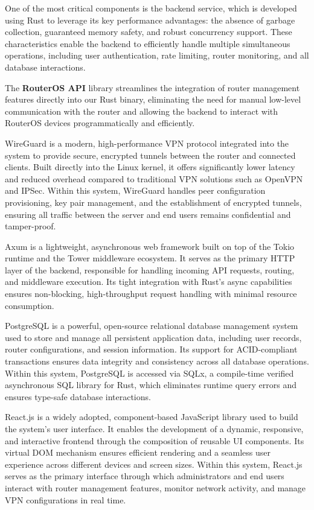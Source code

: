\documentclass[12pt,a4paper,oneside]{report}
\begin{document}
One of the most critical components is the backend service, which is developed using Rust to leverage its key performance advantages: the absence of garbage collection, guaranteed memory safety, and robust concurrency support. These characteristics enable the backend to efficiently handle multiple simultaneous operations, including user authentication, rate limiting, router monitoring, and all database interactions.


The \textbf{RouterOS API} library streamlines the integration of router management features directly into our Rust binary, eliminating the need for manual low-level communication with the router and allowing the backend to interact with RouterOS devices programmatically and efficiently.


WireGuard is a modern, high-performance VPN protocol integrated into the system to provide secure, encrypted tunnels between the router and connected clients. Built directly into the Linux kernel, it offers significantly lower latency and reduced overhead compared to traditional VPN solutions such as OpenVPN and IPSec. Within this system, WireGuard handles peer configuration provisioning, key pair management, and the establishment of encrypted tunnels, ensuring all traffic between the server and end users remains confidential and tamper-proof.


Axum is a lightweight, asynchronous web framework built on top of the Tokio runtime and the Tower middleware ecosystem. It serves as the primary HTTP layer of the backend, responsible for handling incoming API requests, routing, and middleware execution. Its tight integration with Rust's async capabilities ensures non-blocking, high-throughput request handling with minimal resource consumption.




PostgreSQL is a powerful, open-source relational database management system used to store and manage all persistent application data, including user records, router configurations, and session information. Its support for ACID-compliant transactions ensures data integrity and consistency across all database operations. Within this system, PostgreSQL is accessed via SQLx, a compile-time verified asynchronous SQL library for Rust, which eliminates runtime query errors and ensures type-safe database interactions.


React.js is a widely adopted, component-based JavaScript library used to build the system's user interface. It enables the development of a dynamic, responsive, and interactive frontend through the composition of reusable UI components. Its virtual DOM mechanism ensures efficient rendering and a seamless user experience across different devices and screen sizes. Within this system, React.js serves as the primary interface through which administrators and end users interact with router management features, monitor network activity, and manage VPN configurations in real time.
\end{document}
